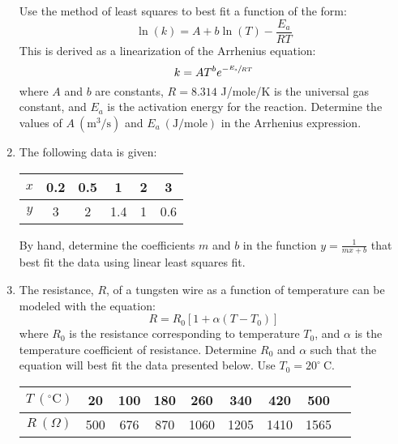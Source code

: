 \begin{fullwidth}
\begin{enumerate}
\noindent Use the method of least squares to best fit a function of the form: 
\begin{equation*}
\ln{(k)} = A + b\ln{(T)} - \frac{E_a}{RT}
\end{equation*}
This is derived as a linearization of the Arrhenius equation:
\begin{equation*}
k = AT^be^{-\sfrac{E_a}{RT}}
\end{equation*}
where $A$ and $b$ are constants, $R=8.314$ J/mole/K is the universal gas constant, and $E_a$ is the activation energy for the reaction.  Determine the values of $A \ (\text{m}^3/\text{s})$ and $E_a \ (\text{J/mole})$ in the Arrhenius expression.

\vspace{3.0cm}

\item The following data is given:

\begin{table}[h!]
\begin{tabular}{|c|c|c|c|c|c|}
\hline
$x$ & 0.2 & 0.5 & 1 & 2 & 3 \\ \hline
$y$ & 3 & 2 & 1.4 & 1 & 0.6 \\ \hline
\end{tabular}
\end{table}

\vspace{0.2cm}

\noindent By hand, determine the coefficients $m$ and $b$ in the function $y = \frac{1}{mx + b}$ that best fit the data using linear least squares fit.

\vspace{3.0cm}

\item The resistance, $R$, of a tungsten wire as a function of temperature can be modeled with the equation:
\begin{equation*}
R = R_0 \left[ 1 + \alpha \left( T - T_0\right) \right]
\end{equation*}
where $R_0$ is the resistance corresponding to temperature $T_0$, and $\alpha$ is the temperature coefficient of resistance.  Determine $R_0$ and $\alpha$ such that the equation will best fit the data presented below.  Use $T_0 = 20^{\circ} \ $C.  

\begin{table}[h!]
\begin{tabular}{|c|c|c|c|c|c|c|c|c|}
\hline
$T \ (^{\circ} \text{C})$ & 20 & 100 & 180 & 260 & 340 & 420 & 500 \\ \hline
$R \ (\Omega)$ & 500 & 676 & 870 & 1060 & 1205 & 1410 & 1565 \\ \hline
\end{tabular}
\end{table}


\end{enumerate}
\end{fullwidth}
